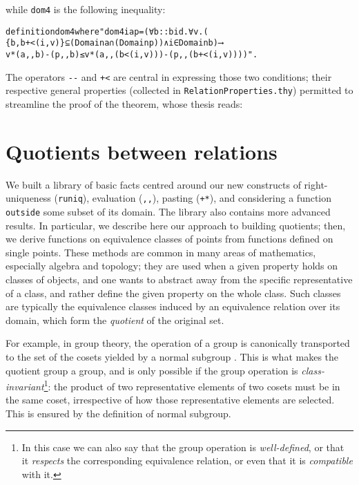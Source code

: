 \documentclass[
]{llncs}
\newenvironment{mytable}{
\vspace{0.2ex}
\begin{center}\begin{minipage}
{0.9\textwidth}\renewcommand{\baselinestretch}{0.75}\begin{small}}
{\end{small}\end{minipage}\end{center}
\vspace{0.1ex}
}
\begin{document}
\noindent while \verb|dom4| is the following inequality:

\begin{mytable}
\begin{alltt}
definition dom4 where "dom4 i a p = (∀ b::bid. ∀ v.(
\{b,b+<(i,v)\}⊆(Domain a ∩ (Domain p)) ∧ i∈Domain b)⟶ 
v*(a,,b)-(p,,b) ≤ v*(a,,(b<(i,v)))-(p,,(b+<(i,v))))".
\end{alltt}
\end{mytable}

The operators \verb|--| and \verb|+<| are central in expressing those two conditions; 
their respective general properties (collected in \verb|RelationProperties.thy|) permitted to streamline the proof of the theorem, whose thesis reads:












\section{Quotients between relations}
\label{RefQuotients}
We built a library of basic facts centred around our new constructs of right-uniqueness (\verb|runiq|), evaluation (\verb|,,|), pasting (\verb|+*|), 
and considering a function \verb|outside| some subset of its domain.
The library also contains more advanced results.
In particular, we describe here our approach to building quotients; then, we derive functions on equivalence classes of points from functions defined on single points.
These methods are common in many areas of mathematics, especially algebra and topology; they are used when a given property holds on classes of objects, and one wants to abstract away from the specific representative of a class, and rather define the given property on the whole class. 
Such classes are typically the equivalence classes induced by an equivalence relation over its domain, which form the \emph{quotient} of the original set.

For example, in group theory, the operation of a group  is canonically transported to the set of the cosets yielded by a normal subgroup . 
This is what makes the quotient group  a group, and is only possible if the group operation is \emph{class-invariant}\footnote{In this case we can also say that the group operation is \emph{well-defined}, or that it \emph{respects} the corresponding equivalence relation, or even that it is \emph{compatible} with it.}: 
the product of two representative elements of two cosets must be in the same coset, irrespective of how those representative elements are selected. 
This is ensured by the definition of normal subgroup.
\end{document}
